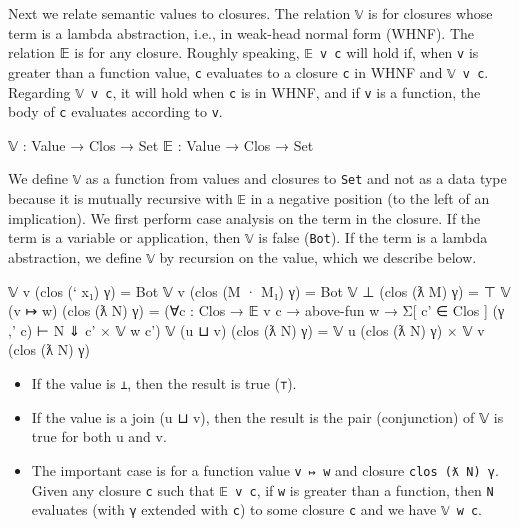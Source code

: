Next we relate semantic values to closures. The relation \texttt{𝕍} is
for closures whose term is a lambda abstraction, i.e., in weak-head
normal form (WHNF). The relation 𝔼 is for any closure. Roughly speaking,
\texttt{𝔼\ v\ c} will hold if, when \texttt{v} is greater than a
function value, \texttt{c} evaluates to a closure
\texttt{c\textquotesingle{}} in WHNF and
\texttt{𝕍\ v\ c\textquotesingle{}}. Regarding \texttt{𝕍\ v\ c}, it will
hold when \texttt{c} is in WHNF, and if \texttt{v} is a function, the
body of \texttt{c} evaluates according to \texttt{v}.

\begin{fence}
\begin{code}
𝕍 : Value → Clos → Set
𝔼 : Value → Clos → Set
\end{code}
\end{fence}

We define \texttt{𝕍} as a function from values and closures to
\texttt{Set} and not as a data type because it is mutually recursive
with \texttt{𝔼} in a negative position (to the left of an implication).
We first perform case analysis on the term in the closure. If the term
is a variable or application, then \texttt{𝕍} is false (\texttt{Bot}).
If the term is a lambda abstraction, we define \texttt{𝕍} by recursion
on the value, which we describe below.

\begin{fence}
\begin{code}
𝕍 v (clos (` x₁) γ) = Bot
𝕍 v (clos (M · M₁) γ) = Bot
𝕍 ⊥ (clos (ƛ M) γ) = ⊤
𝕍 (v ↦ w) (clos (ƛ N) γ) =
    (∀{c : Clos} → 𝔼 v c → above-fun w → Σ[ c' ∈ Clos ]
        (γ ,' c) ⊢ N ⇓ c'  ×  𝕍 w c')
𝕍 (u ⊔ v) (clos (ƛ N) γ) = 𝕍 u (clos (ƛ N) γ) × 𝕍 v (clos (ƛ N) γ)
\end{code}
\end{fence}

\begin{itemize}
\item
  If the value is \texttt{⊥}, then the result is true (\texttt{⊤}).
\item
  If the value is a join (u ⊔ v), then the result is the pair
  (conjunction) of 𝕍 is true for both u and v.
\item
  The important case is for a function value \texttt{v\ ↦\ w} and
  closure \texttt{clos\ (ƛ\ N)\ γ}. Given any closure \texttt{c} such
  that \texttt{𝔼\ v\ c}, if \texttt{w} is greater than a function, then
  \texttt{N} evaluates (with \texttt{γ} extended with \texttt{c}) to
  some closure \texttt{c\textquotesingle{}} and we have
  \texttt{𝕍\ w\ c\textquotesingle{}}.
\end{itemize}

